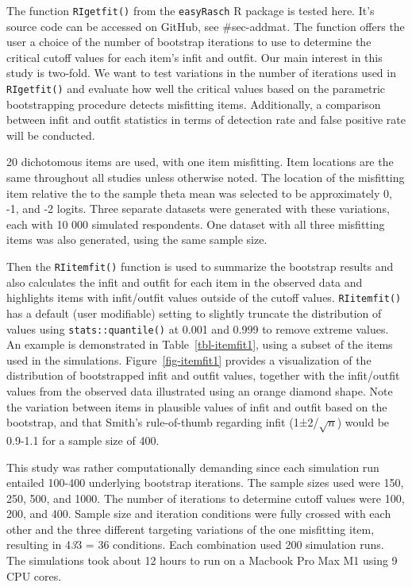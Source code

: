\documentclass[
  letterpaper,
  DIV=11,
  numbers=noendperiod]{scrartcl}
\begin{document}
The function \texttt{RIgetfit()} from the \texttt{easyRasch} R package
is tested here. It's source code can be accessed on GitHub, see
\#sec-addmat. The function offers the user a choice of the number of
bootstrap iterations to use to determine the critical cutoff values for
each item's infit and outfit. Our main interest in this study is
two-fold. We want to test variations in the number of iterations used in
\texttt{RIgetfit()} and evaluate how well the critical values based on
the parametric bootstrapping procedure detects misfitting items.
Additionally, a comparison between infit and outfit statistics in terms
of detection rate and false positive rate will be conducted.

20 dichotomous items are used, with one item misfitting. Item locations
are the same throughout all studies unless otherwise noted. The location
of the misfitting item relative the to the sample theta mean was
selected to be approximately 0, -1, and -2 logits. Three separate
datasets were generated with these variations, each with 10 000
simulated respondents. One dataset with all three misfitting items was
also generated, using the same sample size.

Then the \texttt{RIitemfit()} function is used to summarize the
bootstrap results and also calculates the infit and outfit for each item
in the observed data and highlights items with infit/outfit values
outside of the cutoff values. \texttt{RIitemfit()} has a default (user
modifiable) setting to slightly truncate the distribution of values
using \texttt{stats::quantile()} at 0.001 and 0.999 to remove extreme
values. An example is demonstrated in Table~\ref{tbl-itemfit1}, using a
subset of the items used in the simulations. Figure~\ref{fig-itemfit1}
provides a visualization of the distribution of bootstrapped infit and
outfit values, together with the infit/outfit values from the observed
data illustrated using an orange diamond shape. Note the variation
between items in plausible values of infit and outfit based on the
bootstrap, and that Smith's rule-of-thumb regarding infit
(1±2/\(\sqrt{n}\)) would be 0.9-1.1 for a sample size of 400.

This study was rather computationally demanding since each simulation
run entailed 100-400 underlying bootstrap iterations. The sample sizes
used were 150, 250, 500, and 1000. The number of iterations to determine
cutoff values were 100, 200, and 400. Sample size and iteration
conditions were fully crossed with each other and the three different
targeting variations of the one misfitting item, resulting in 4\emph{3}3
= 36 conditions. Each combination used 200 simulation runs. The
simulations took about 12 hours to run on a Macbook Pro Max M1 using 9
CPU cores.
\end{document}
